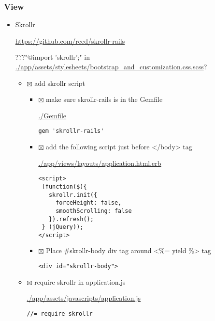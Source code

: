 \documentclass[11pt]{article}
\begin{document}
\subsubsection*{View}
\label{sec-1-3-2}

\begin{itemize}
\item Skrollr
\label{sec-1-3-2-1}

\url{https://github.com/reed/skrollr-rails}

???"@import 'skrollr';" in \url{./app/assets/stylesheets/bootstrap_and_customization.css.scss}?

\begin{itemize}
\item $\boxtimes$ add skrollr script

\begin{itemize}
\item $\boxtimes$ make sure skrollr-rails is in the Gemfile

\url{./Gemfile}

\begin{verbatim}
gem 'skrollr-rails'
\end{verbatim}

\item $\boxtimes$ add the following script just before </body> tag

\url{./app/views/layouts/application.html.erb}

\begin{verbatim}
<script>
 (function($){
   skrollr.init({
     forceHeight: false,
     smoothScrolling: false
   }).refresh();
 } (jQuery));
</script>
\end{verbatim}

\item $\boxtimes$ Place \#skrollr-body div tag around <\%= yield \%> tag

\begin{verbatim}
<div id="skrollr-body">
\end{verbatim}
\end{itemize}
\end{itemize}


\begin{itemize}
\item $\boxtimes$ require skrollr in application.js

\url{./app/assets/javascripts/application.js}

\begin{verbatim}
//= require skrollr
\end{verbatim}


\end{itemize}
\end{itemize}
\end{document}
